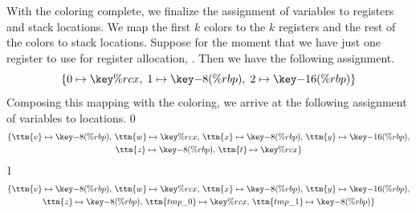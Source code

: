 \documentclass[7x10]{TimesAPriori_MIT}%
\def\racketEd{0}
\def\pythonEd{1}
\providecommand{\BookEdition}{1}
\let\edition\BookEdition
\newcommand{\pythonColor}[0]{}
\numberwithin{theorem}{chapter}
\numberwithin{definition}{chapter}
\numberwithin{equation}{chapter}
\begin{document}
With the coloring complete, we finalize the assignment of variables to
registers and stack locations. We map the first $k$ colors to the $k$
registers and the rest of the colors to stack locations.  Suppose for
the moment that we have just one register to use for register
allocation, . Then we have the following assignment.
\[
  \{ 0 \mapsto \key{\%rcx}, \; 1 \mapsto \key{-8(\%rbp)}, \; 2 \mapsto \key{-16(\%rbp)} \}
\]
Composing this mapping with the coloring, we arrive at the following
assignment of variables to locations.
{\if\edition\racketEd      
\begin{gather*}
  \{ \ttm{v} \mapsto \key{-8(\%rbp)}, \,
     \ttm{w} \mapsto \key{\%rcx},  \,
     \ttm{x} \mapsto \key{-8(\%rbp)}, \,
     \ttm{y} \mapsto \key{-16(\%rbp)}, \\
     \ttm{z} \mapsto \key{-8(\%rbp)}, \,
     \ttm{t} \mapsto \key{\%rcx} \}
\end{gather*}
\fi}
{\if\edition\pythonEd\pythonColor
\begin{gather*}
  \{ \ttm{v} \mapsto \key{-8(\%rbp)},  \,
     \ttm{w} \mapsto \key{\%rcx}, \,
     \ttm{x} \mapsto \key{-8(\%rbp)}, \,
     \ttm{y} \mapsto \key{-16(\%rbp)}, \\
     \ttm{z} \mapsto \key{-8(\%rbp)}, \,
     \ttm{tmp\_0} \mapsto \key{\%rcx}, \,
     \ttm{tmp\_1} \mapsto \key{-8(\%rbp)} \}
\end{gather*}
\fi}
\end{document}
